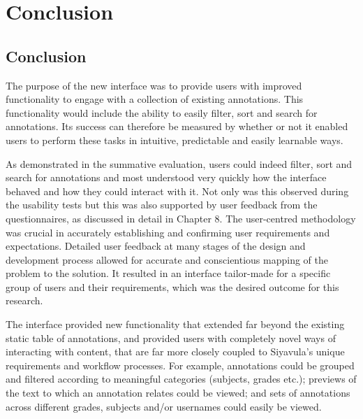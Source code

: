 
\chapter{Conclusion} %

\label{Conclusion} %



\section{Conclusion}
The purpose of the new interface was to provide users with improved functionality to engage with a collection of existing annotations. This functionality would include the ability to easily filter, sort and search for annotations. Its success can therefore be measured by whether or not it enabled users to perform these tasks in intuitive, predictable and easily learnable ways. 

As demonstrated in the summative evaluation, users could indeed filter, sort and search for annotations and most understood very quickly how the interface behaved and how they could interact with it. Not only was this observed during the usability tests but this was also supported by user feedback from the questionnaires, as discussed in detail in Chapter 8. The user-centred methodology was crucial in accurately establishing and confirming user requirements and expectations. Detailed user feedback at many stages of the design and development process allowed for accurate and conscientious mapping of the problem to the solution. It resulted in an interface tailor-made for a specific group of users and their requirements, which was the desired outcome for this research. 

The interface provided new functionality that extended far beyond the existing static table of annotations, and provided users with completely novel ways of interacting with content, that are far more closely coupled to Siyavula's unique requirements and workflow processes. For example, annotations could be grouped and filtered according to meaningful categories (subjects, grades etc.); previews of the text to which an annotation relates could be viewed; and sets of annotations across different grades, subjects and/or usernames could easily be viewed. 

